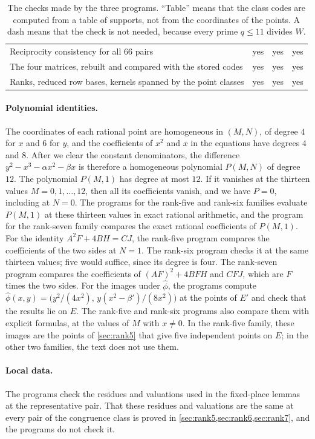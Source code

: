 \documentclass[12pt,oneside,openany]{book}
\theoremstyle{definition}
\theoremstyle{plain}
\numberwithin{equation}{chapter}
\theoremstyle{plain}
\theoremstyle{definition}
\theoremstyle{remark}
\newcommand{\dual}{\hat\phi}
\begin{document}
\begin{table}[!htbp]
\begin{tabular}{@{}p{}p{}p{}p{}@{}}
Reciprocity consistency for all $66$ pairs & yes & yes & yes\\
The four matrices, rebuilt and compared with the stored codes & yes & yes & yes\\
Ranks, reduced row bases, kernels spanned by the point classes & yes & yes & yes\\
\bottomrule
\end{tabular}
\caption{The checks made by the three programs. ``Table'' means that the class codes are computed from a table of supports, not from the coordinates of the points. A dash means that the check is not needed, because every prime $q\le11$ divides $W$.}
\label{tab:verification-scope}
\end{table}

\paragraph{Polynomial identities.} The coordinates of each rational point are homogeneous in $(M,N)$, of degree $4$ for $x$ and $6$ for $y$, and the coefficients of $x^2$ and $x$ in the equations have degrees $4$ and $8$. After we clear the constant denominators, the difference $y^2-x^3-\alpha x^2-\beta x$ is therefore a homogeneous polynomial $P(M,N)$ of degree $12$. The polynomial $P(M,1)$ has degree at most $12$. If it vanishes at the thirteen values $M=0,1,\dots,12$, then all its coefficients vanish, and we have $P=0$, including at $N=0$. The programs for the rank-five and rank-six families evaluate $P(M,1)$ at these thirteen values in exact rational arithmetic, and the program for the rank-seven family compares the exact rational coefficients of $P(M,1)$. For the identity $A^2F+4BH=CJ$, the rank-five program compares the coefficients of the two sides at $N=1$. The rank-six program checks it at the same thirteen values; five would suffice, since its degree is four. The rank-seven program compares the coefficients of $(AF)^2+4BFH$ and $CFJ$, which are $F$ times the two sides. For the images under $\dual$, the programs compute $\dual(x,y)=\big(y^2/(4x^2),\,y(x^2-\beta')/(8x^2)\big)$ at the points of $E'$ and check that the results lie on $E$. The rank-five and rank-six programs also compare them with explicit formulas, at the values of $M$ with $x\ne0$. In the rank-five family, these images are the points of \cref{sec:rank5} that give five independent points on $E$; in the other two families, the text does not use them.

\paragraph{Local data.} The programs check the residues and valuations used in the fixed-place lemmas at the representative pair. That these residues and valuations are the same at every pair of the congruence class is proved in \cref{sec:rank5,sec:rank6,sec:rank7}, and the programs do not check it.
\end{document}

